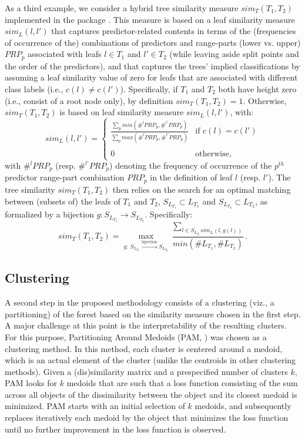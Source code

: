 As a third example, we consider a hybrid tree similarity measure $sim_T(T_1,T_2)$ implemented in the package . This measure is based on a leaf similarity measure $sim_L(l,l')$ that captures predictor-related contents in terms of the (frequencies of occurrence of the) combinations of predictors and range-parts (lower vs. upper) $PRP_p$ associated with leafs $l \in T_1$ and $l' \in T_2$ (while leaving aside split points and the order of the predictors), and that captures the trees' implied classifications by assuming a leaf similarity value of zero for leafs that are associated with different class labels (i.e., $c(l) \neq c(l')$). Specifically, if $T_1$ and $T_2$ both have height zero (i.e., consist of a root node only), by definition $sim_T(T_1,T_2)=1$. Otherwise, $sim_T(T_1,T_2)$ is based on leaf similarity measure $sim_L(l,l')$, with:
\begin{equation}
sim_L(l,l')=\begin{cases}
\frac{\sum_{p} min (\#^{l} PRP_p, \#^{l'} PRP_p)}{\sum_{p} max (\#^{l} PRP_p, \#^{l'}PRP_p)} & \text{if } c(l) = c(l') \\ \\
0 & \text{otherwise},
\end{cases}
\end{equation}
with $\#^{l}PRP_p$ (resp. $\#^{l'}PRP_p$) denoting the frequency of occurrence of the $p^{th}$ predictor range-part combination $PRP_p$ in the definition of leaf $l$ (resp. $l'$). The tree similarity $sim_T(T_1,T_2)$ then relies on the search for an optimal matching between (subsets of) the leafs of $T_1$ and $T_2$, $S_{L_{T_1}} \subset L_{T_1}$ and $S_{L_{T_2}} \subset L_{T_2}$, as formalized by a bijection $g: S_{L_{T_1}} \to S_{L_{T_2}}$. Specifically:
\begin{equation}
sim_T(T_1,T_2)={\underset{g:~S_{L_{T_1}} \overset{\text{bijection}}\longrightarrow S_{L_{T_2}} }\max\frac{\sum_{l \in S_{L_{T_1}}sim_L(l,g(l))}}{min(\#L_{T_1},\#L_{T_2})}}.
\end{equation}


\subsection{Clustering}
A second step in the proposed methodology consists of a clustering (viz., a partitioning) of the forest based on the similarity measure chosen in the first step. A major challenge at this point is the interpretability of the resulting clusters. For this purpose, Partitioning Around Medoids (PAM, \citet{Kaufman2009}) was chosen as a clustering method. In this method, each cluster is centered around a medoid, which is an actual element of the cluster (unlike the centroids in other clustering methods). Given a (dis)similarity matrix and a prespecified number of clusters $k$, PAM looks for $k$ medoids that are such that a loss function consisting of the sum across all objects of the dissimilarity between the object and its closest medoid is minimized. PAM starts with an initial selection of $k$ medoids, and subsequently replaces iteratively each medoid by the object that minimizes the loss function until no further improvement in the loss function is observed.

